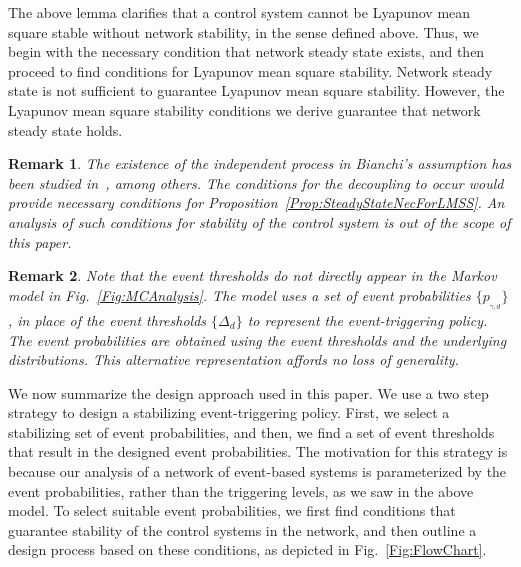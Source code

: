 \documentclass[twocolumn]{autart}
\newtheorem{remark}{Remark}[section]
\begin{document}
The above lemma clarifies that a control system cannot be Lyapunov mean square stable without network stability, in the sense defined above. Thus, we begin with the necessary condition that network steady state exists, and then proceed to find conditions for Lyapunov mean square stability. Network steady state is not sufficient to guarantee Lyapunov mean square stability. However, the Lyapunov mean square stability conditions we derive guarantee that network steady state holds.

\begin{remark}\textbf{}
The existence of the independent process in Bianchi's assumption has been studied in~\cite{Bordenave2010}, among others. The conditions for the decoupling to occur would provide necessary conditions for Proposition~\ref{Prop:SteadyStateNecForLMSS}. An analysis of such conditions for stability of the control system is out of the scope of this paper.
\end{remark}

\begin{remark}\textbf{}
Note that the event thresholds do not directly appear in the Markov model in Fig.~\ref{Fig:MCAnalysis}. The model uses a set of event probabilities $\{p_{_{\gamma,d}}\}$, in place of the event thresholds $\{\Delta_d\}$ to represent the event-triggering policy. The event probabilities are obtained using the event thresholds and the underlying distributions. This alternative representation affords no loss of generality.
\end{remark}

We now summarize the design approach used in this paper. We use a two step strategy to design a stabilizing event-triggering policy. First, we select a stabilizing set of event probabilities, and then, we find a set of event thresholds that result in the designed event probabilities. The motivation for this strategy is because our analysis of a network of event-based systems is parameterized by the event probabilities, rather than the triggering levels, as we saw in the above model. To select suitable event probabilities, we first find conditions that guarantee stability of the control systems in the network, and then outline a design process based on these conditions, as depicted in Fig.~\ref{Fig:FlowChart}.
\end{document}
